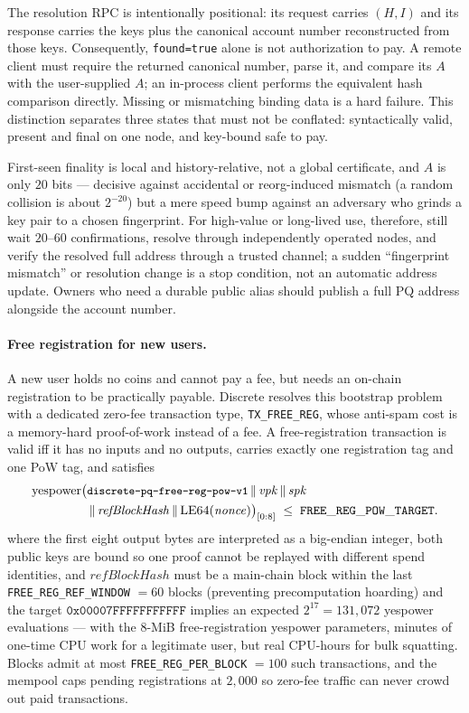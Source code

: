 \documentclass[11pt,a4paper]{article}
\newcommand{\code}[1]{\texttt{\small #1}}
\newcommand{\concat}{\,\|\,}
\begin{document}
The resolution RPC is intentionally positional: its request carries $(H,I)$ and
its response carries the keys plus the canonical account number reconstructed
from those keys. Consequently, \code{found=true} alone is not authorization to
pay. A remote client must require the returned canonical number, parse it, and
compare its $A$ with the user-supplied $A$; an in-process client performs the
equivalent hash comparison directly. Missing or mismatching binding data is a
hard failure. This distinction separates three states that must not be conflated:
syntactically valid, present and final on one node, and key-bound safe to pay.

First-seen finality is local and history-relative, not a global certificate, and
$A$ is only $20$ bits --- decisive against accidental or reorg-induced mismatch
(a random collision is about $2^{-20}$) but a mere speed bump against an adversary
who grinds a key pair to a chosen fingerprint. For high-value or long-lived use,
therefore, still wait $20$--$60$ confirmations, resolve through independently
operated nodes, and verify the resolved full address through a trusted channel; a
sudden ``fingerprint mismatch'' or resolution change is a stop condition, not an
automatic address update. Owners who need a durable public alias should publish a
full PQ address alongside the account number.

\paragraph{Free registration for new users.}
A new user holds no coins and cannot pay a fee, but needs an on-chain
registration to be practically payable. Discrete resolves this bootstrap
problem with a dedicated zero-fee transaction type, \code{TX\_FREE\_REG},
whose anti-spam cost is a memory-hard proof-of-work instead of a fee. A
free-registration transaction is valid iff it has no inputs and no outputs,
carries exactly one registration tag and one PoW tag, and satisfies
\begin{equation}
\begin{aligned}
\mathrm{yespower}\bigl(&\text{\code{discrete-pq-free-reg-pow-v1}}
 \concat \mathit{vpk} \concat \mathit{spk} \\
 &\concat \mathit{refBlockHash} \concat
 \mathrm{LE64}(\mathit{nonce})\bigr)_{[0:8]}
 \;\le\; \mathtt{FREE\_REG\_POW\_TARGET}.
\end{aligned}
\end{equation}
where the first eight output bytes are interpreted as a big-endian integer, both
public keys are bound so one proof cannot be replayed with different spend
identities, and $\mathit{refBlockHash}$ must be a main-chain block within the last
\code{FREE\_REG\_REF\_WINDOW} $= 60$ blocks (preventing precomputation
hoarding) and the target $\mathtt{0x00007FFFFFFFFFFF}$ implies an expected
$2^{17} = 131{,}072$ yespower evaluations --- with the 8-MiB free-registration
yespower parameters, minutes of one-time CPU work for a legitimate user, but real
CPU-hours for bulk squatting. Blocks admit at most
\code{FREE\_REG\_PER\_BLOCK} $= 100$ such transactions, and the mempool caps
pending registrations at $2{,}000$ so zero-fee traffic can never crowd out
paid transactions.
\end{document}

